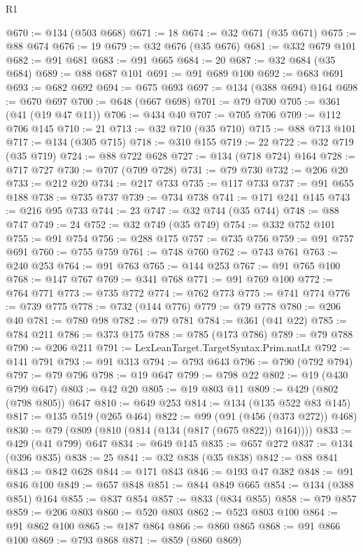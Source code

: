 \begin{lexlean}{R1}
\begin{coremodule}
@670 := @134 (@503 @668)
@671 := 18
@674 := @32 @671 (@35 @671)
@675 := @88 @674
@676 := 19
@679 := @32 @676 (@35 @676)
@681 := @332 @679 @101
@682 := @91 @681
@683 := @91 @665
@684 := 20
@687 := @32 @684 (@35 @684)
@689 := @88 @687 @101
@691 := @91 @689 @100
@692 := @683 @691
@693 := @682 @692
@694 := @675 @693
@697 := @134 (@388 @694) @164
@698 := @670 @697
@700 := @648 (@667 @698)
@701 := @79 @700
@705 := @361 (@41 (@19 @47 @11))
@706 := @434 @40
@707 := @705 @706
@709 := @112 @706 @145
@710 := 21
@713 := @32 @710 (@35 @710)
@715 := @88 @713 @101
@717 := @134 (@305 @715)
@718 := @310 @155
@719 := 22
@722 := @32 @719 (@35 @719)
@724 := @88 @722 @628
@727 := @134 (@718 @724) @164
@728 := @717 @727
@730 := @707 (@709 @728)
@731 := @79 @730
@732 := @206 @20
@733 := @212 @20
@734 := @217 @733
@735 := @117 @733
@737 := @91 @655 @188
@738 := @735 @737
@739 := @734 @738
@741 := @171 @241 @145
@743 := @216 @95 @733
@744 := 23
@747 := @32 @744 (@35 @744)
@748 := @88 @747
@749 := 24
@752 := @32 @749 (@35 @749)
@754 := @332 @752 @101
@755 := @91 @754
@756 := @288 @175
@757 := @735 @756
@759 := @91 @757 @691
@760 := @755 @759
@761 := @748 @760
@762 := @743 @761
@763 := @240 @253
@764 := @91 @763
@765 := @144 @253
@767 := @91 @765 @100
@768 := @147 @767
@769 := @341 @768
@771 := @91 @769 @100
@772 := @764 @771
@773 := @735 @772
@774 := @762 @773
@775 := @741 @774
@776 := @739 @775
@778 := @732 (@144 @776)
@779 := @79 @778
@780 := @206 @40
@781 := @780 @98
@782 := @79 @781
@784 := @361 (@41 @22)
@785 := @784 @211
@786 := @373 @175
@788 := @785 (@173 @786)
@789 := @79 @788
@790 := @206 @211
@791 := LexLeanTarget.TargetSyntax.Prim.natLt
@792 := @141 @791
@793 := @91 @313
@794 := @793 @643
@796 := @790 (@792 @794)
@797 := @79 @796
@798 := @19 @647
@799 := @798 @22
@802 := @19 (@430 @799 @647)
@803 := @42 @20
@805 := @19 @803 @11
@809 := @429 (@802 (@798 @805)) @647
@810 := @649 @253
@814 := @134 (@135 @522 @83 @145)
@817 := @135 @519 (@265 @464)
@822 := @99 (@91 (@456 (@373 @272)) @468)
@830 := @79 (@809 (@810 (@814 (@134 (@817 (@675 @822)) @164))))
@833 := @429 (@41 @799) @647
@834 := @649 @145
@835 := @657 @272
@837 := @134 (@396 @835)
@838 := 25
@841 := @32 @838 (@35 @838)
@842 := @88 @841
@843 := @842 @628
@844 := @171 @843
@846 := @193 @47 @382
@848 := @91 @846 @100
@849 := @657 @848
@851 := @844 @849 @665
@854 := @134 (@388 @851) @164
@855 := @837 @854
@857 := @833 (@834 @855)
@858 := @79 @857
@859 := @206 @803
@860 := @520 @803
@862 := @523 @803 @100
@864 := @91 @862 @100
@865 := @187 @864
@866 := @860 @865
@868 := @91 @866 @100
@869 := @793 @868
@871 := @859 (@860 @869)

\end{coremodule}
\end{lexlean}
